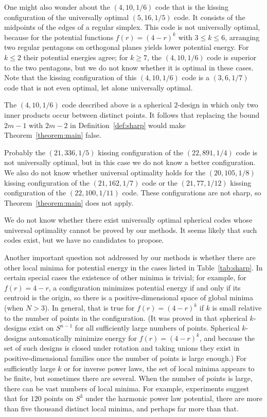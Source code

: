 \documentclass{jams-l}
\theoremstyle{plain}
\numberwithin{theorem}{section}
\theoremstyle{definition}
\numberwithin{equation}{section}
\begin{document}
One might also wonder about the $(4,10,1/6)$ code that is the
kissing configuration of the universally optimal $(5,16,1/5)$
code.  It consists of the midpoints of the edges of a regular
simplex. This code is not universally optimal, because for the
potential functions $f(r) = (4-r)^k$  with $3 \le k \le 6$,
arranging two regular pentagons on orthogonal planes yields lower
potential energy.  For $k \le 2$ their potential energies agree;
for $k \ge 7$, the $(4,10,1/6)$ code is superior to the two
pentagons, but we do not know whether it is optimal in these
cases.  Note that the kissing configuration of this $(4,10,1/6)$
code is a $(3,6,1/7)$ code that is not even optimal, let alone
universally optimal.

The $(4,10,1/6)$ code described above is a spherical $2$-design in
which only two inner products occur between distinct points.  It
follows that replacing the bound $2m-1$ with $2m-2$ in
Definition~\ref{def:sharp} would make Theorem~\ref{theorem:main}
false.

Probably the $(21,336,1/5)$ kissing configuration of the
$(22,891,1/4)$ code is not universally optimal, but in this case
we do not know a better configuration. We also do not know whether
universal optimality holds for the $(20,105,1/8)$ kissing
configuration of the $(21,162,1/7)$ code or the $(21,77,1/12)$
kissing configuration of the $(22,100,1/11)$ code.  These
configurations are not sharp, so Theorem~\ref{theorem:main} does
not apply.

We do not know whether there exist universally optimal spherical
codes whose universal optimality cannot be proved by our methods.
It seems likely that such codes exist, but we have no candidates
to propose.

Another important question not addressed by our methods is whether
there are other local minima for potential energy in the cases
listed in Table~\ref{tab:sharp}.  In certain special cases the
existence of other minima is trivial; for example, for $f(r)=4-r$,
a configuration minimizes potential energy if and only if its
centroid is the origin, so there is a positive-dimensional space
of global minima (when $N>3$).  In general, that is true for $f(r)
= (4-r)^k$ if $k$ is small relative to the number of points in the
configuration.  (It was proved in \cite{SZ} that spherical
$k$-designs exist on $S^{n-1}$ for all sufficiently large numbers
of points.  Spherical $k$-designs automatically minimize energy
for $f(r) = (4-r)^k$, and because the set of such designs is
closed under rotation and taking unions they exist in
positive-dimensional families once the number of points is large
enough.) For sufficiently large $k$ or for inverse power laws, the
set of local minima appears to be finite, but sometimes there are
several. When the number of points is large, there can be vast
numbers of local minima.  For example, experiments suggest that
for $120$ points on $S^3$ under the harmonic power law potential,
there are more than five thousand distinct local minima, and
perhaps far more than that.
\end{document}

